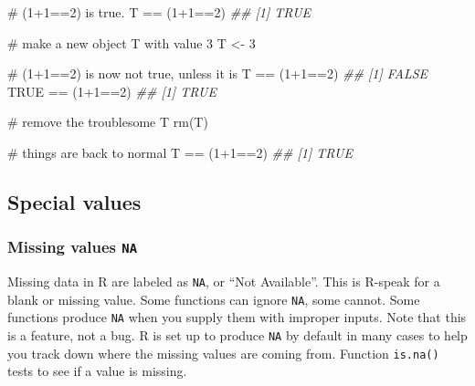 \documentclass[
  13,
  letterpaper,
]{report}
\newenvironment{Shaded}{\begin{snugshade}}{\end{snugshade}}
\newcommand{\CommentTok}[1]{\textcolor[rgb]{0.37,0.37,0.37}{#1}}
\newcommand{\ConstantTok}[1]{\textcolor[rgb]{0.56,0.35,0.01}{#1}}
\newcommand{\DecValTok}[1]{\textcolor[rgb]{0.68,0.00,0.00}{#1}}
\newcommand{\DocumentationTok}[1]{\textcolor[rgb]{0.37,0.37,0.37}{\textit{#1}}}
\newcommand{\FunctionTok}[1]{\textcolor[rgb]{0.28,0.35,0.67}{#1}}
\newcommand{\NormalTok}[1]{\textcolor[rgb]{0.00,0.23,0.31}{#1}}
\newcommand{\OtherTok}[1]{\textcolor[rgb]{0.00,0.23,0.31}{#1}}
\newcommand{\SpecialCharTok}[1]{\textcolor[rgb]{0.37,0.37,0.37}{#1}}
\begin{document}
\begin{Shaded}
\begin{Highlighting}[]
\CommentTok{\# (1+1==2) is true.}
\NormalTok{T }\SpecialCharTok{==}\NormalTok{ (}\DecValTok{1}\SpecialCharTok{+}\DecValTok{1}\SpecialCharTok{==}\DecValTok{2}\NormalTok{)}
\DocumentationTok{\#\# [1] TRUE}

\CommentTok{\# make a new object T with value 3}
\NormalTok{T }\OtherTok{\textless{}{-}} \DecValTok{3}

\CommentTok{\# (1+1==2) is now not true, unless it is}
\NormalTok{T }\SpecialCharTok{==}\NormalTok{ (}\DecValTok{1}\SpecialCharTok{+}\DecValTok{1}\SpecialCharTok{==}\DecValTok{2}\NormalTok{)}
\DocumentationTok{\#\# [1] FALSE}
\ConstantTok{TRUE} \SpecialCharTok{==}\NormalTok{ (}\DecValTok{1}\SpecialCharTok{+}\DecValTok{1}\SpecialCharTok{==}\DecValTok{2}\NormalTok{)}
\DocumentationTok{\#\# [1] TRUE}

\CommentTok{\# remove the troublesome T}
\FunctionTok{rm}\NormalTok{(T)}

\CommentTok{\# things are back to normal}
\NormalTok{T }\SpecialCharTok{==}\NormalTok{ (}\DecValTok{1}\SpecialCharTok{+}\DecValTok{1}\SpecialCharTok{==}\DecValTok{2}\NormalTok{)}
\DocumentationTok{\#\# [1] TRUE}
\end{Highlighting}
\end{Shaded}

\subsection{Special values}\label{sec-object-type-spec}

\subsubsection{\texorpdfstring{Missing values
\texttt{NA}}{Missing values NA}}\label{sec-object-type-spec-na}

Missing data in R are labeled as \texttt{NA}, or ``Not Available''. This
is R-speak for a blank or missing value. Some functions can ignore
\texttt{NA}, some cannot. Some functions produce \texttt{NA} when you
supply them with improper inputs. Note that this is a feature, not a
bug. R is set up to produce \texttt{NA} by default in many cases to help
you track down where the missing values are coming from. Function
\texttt{is.na()} tests to see if a value is missing.
\end{document}
